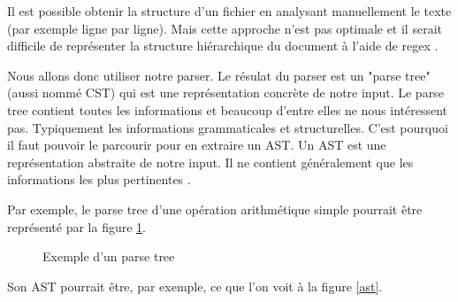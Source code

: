 \documentclass[
    iict, %
    il, %
]{heig-tb}
\begin{document}
Il est possible obtenir la structure d'un fichier en analysant manuellement le texte (par exemple ligne par ligne).
Mais cette approche n'est pas optimale et il serait difficile de représenter la structure hiérarchique du document à l'aide de regex \cite{antlr-mega-tutorial}.

Nous allons donc utiliser notre parser.
Le résulat du parser est un "parse tree" (aussi nommé CST) qui est une représentation concrète de notre input.
Le parse tree contient toutes les informations et beaucoup d'entre elles ne nous intéressent pas.
Typiquement les informations grammaticales et structurelles.
C'est pourquoi il faut pouvoir le parcourir pour en extraire un AST.
Un AST est une représentation abstraite de notre input. Il ne contient généralement que les informations les plus pertinentes \cite{cst}.

Par exemple, le parse tree d'une opération arithmétique simple pourrait être représenté par la figure \ref{parse-tree}.

\begin{figure}[!h]
    \begin{center}
    \end{center}
    \caption[Exemple d'un parse tree]{\label{parse-tree} Exemple d'un parse tree}
\end{figure}

Son AST pourrait être, par exemple, ce que l'on voit à la figure \ref{ast}.
\end{document}

